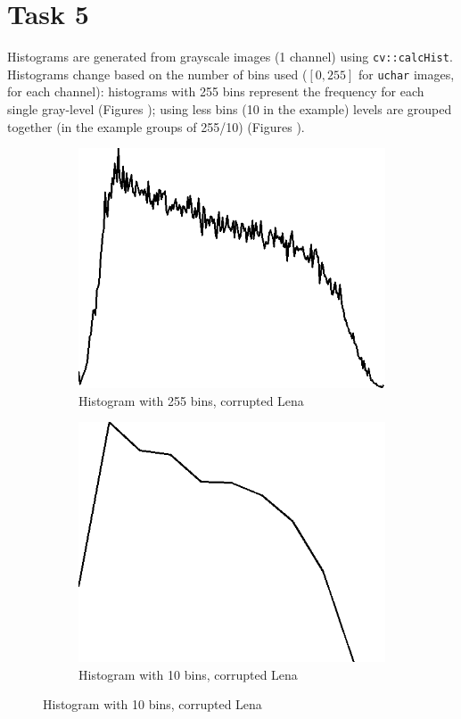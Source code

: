 \documentclass{article}
\begin{document}
\section*{Task 5}
Histograms are generated from grayscale images (1 channel) using \texttt{cv::calcHist}.
Histograms change based on the number of bins used ($[0, 255]$ for \texttt{uchar} images, for each channel): histograms with 255 bins represent the frequency for each single gray-level (Figures ); using less bins (10 in the example) levels are grouped together (in the example groups of 255/10) (Figures ).
\begin{figure}[H]
	\centering
	\begin{subfigure}{0.4\textwidth}
		\includegraphics[width=\textwidth]{Generated/Lena_corrupted_histogramOneChannel255bins.png}
		\caption{Histogram with 255 bins, corrupted Lena}
		\label{fig:hist255_Lena}
	\end{subfigure}
	\hfill
	\begin{subfigure}{0.4\textwidth}
		\includegraphics[width=\textwidth]{Generated/Lena_corrupted_histogramOneChannel10bins.png}
		\caption{Histogram with 10 bins, corrupted Lena}
		\label{fig:hist10_Lena}
	\end{subfigure}


\end{figure}
\end{document}
